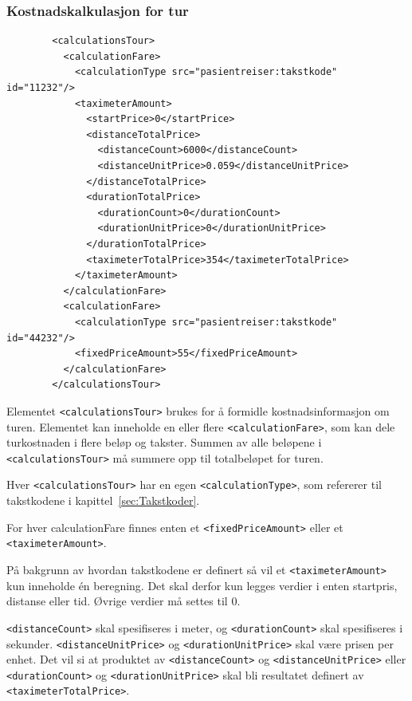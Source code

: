\documentclass[a4paper,titlepage,norsk,11pt]{article}
\begin{document}
\subsubsection{Kostnadskalkulasjon for tur}

\begin{lstlisting}
        <calculationsTour>
          <calculationFare>
            <calculationType src="pasientreiser:takstkode" id="11232"/>
            <taximeterAmount>
              <startPrice>0</startPrice>
              <distanceTotalPrice>
                <distanceCount>6000</distanceCount>
                <distanceUnitPrice>0.059</distanceUnitPrice>
              </distanceTotalPrice>
              <durationTotalPrice>
                <durationCount>0</durationCount>
                <durationUnitPrice>0</durationUnitPrice>
              </durationTotalPrice>
              <taximeterTotalPrice>354</taximeterTotalPrice>
            </taximeterAmount>
          </calculationFare>
          <calculationFare>
            <calculationType src="pasientreiser:takstkode" id="44232"/>
            <fixedPriceAmount>55</fixedPriceAmount>
          </calculationFare>
        </calculationsTour>
\end{lstlisting}

Elementet \lstinline{<calculationsTour>} brukes for å formidle kostnadsinformasjon om turen. Elementet kan inneholde en eller flere \lstinline{<calculationFare>}, som kan dele turkostnaden i flere beløp og takster. Summen av alle beløpene i \lstinline{<calculationsTour>} må summere opp til totalbeløpet for turen.

Hver \lstinline{<calculationsTour>} har en egen \lstinline{<calculationType>}, som refererer til takstkodene i kapittel~\ref{sec:Takstkoder}.

For hver calculationFare finnes enten et \lstinline{<fixedPriceAmount>} eller et \lstinline{<taximeterAmount>}.

På bakgrunn av hvordan takstkodene er definert så vil et \lstinline{<taximeterAmount>} kun inneholde én beregning. Det skal derfor kun legges verdier i enten startpris, distanse eller tid. Øvrige verdier må settes til 0.

\lstinline{<distanceCount>} skal spesifiseres i meter, og \lstinline{<durationCount>} skal spesifiseres i sekunder. \lstinline{<distanceUnitPrice>} og \lstinline{<durationUnitPrice>} skal være prisen per enhet. Det vil si at produktet av \lstinline{<distanceCount>} og \lstinline{<distanceUnitPrice>} eller \lstinline{<durationCount>} og \lstinline{<durationUnitPrice>} skal bli resultatet definert av \lstinline{<taximeterTotalPrice>}.
\end{document}
